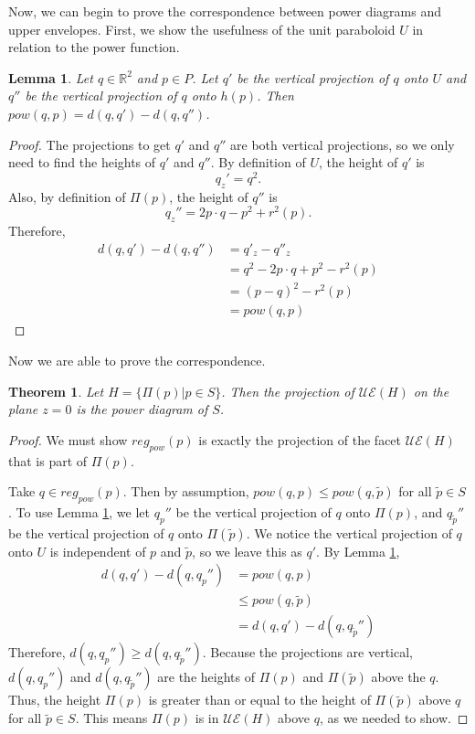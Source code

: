 \documentclass[a4paper, 11pt]{article}
\newtheorem{theorem}{Theorem}[section]
\newtheorem{lemma}{Lemma}[section]
\newcommand{\R}{\mathbb{R}}
\begin{document}
Now, we can begin to prove the correspondence between power diagrams and upper envelopes. First, we show the usefulness of the unit paraboloid $U$ in
relation to the power function.

\begin{lemma}
  \label{lem:proj}
  Let $q \in \R^2$ and $p \in P$. Let $q'$ be the vertical projection of $q$ onto $U$ and $q''$ be the vertical projection of $q$ onto $h(p)$. Then
  $pow(q, p) = d(q, q') - d(q, q'')$.
\end{lemma}
\begin{proof}
  The projections to get $q'$ and $q''$ are both vertical projections, so we only need to find the heights of $q'$ and $q''$. By
  definition of $U$, the height of $q'$ is
  \[ q_z' = q^2.\]
  Also, by definition of $\Pi(p)$, the height of $q''$ is
  \[ q_z'' = 2p \cdot q - p^2 + r^2(p) . \]
  Therefore,
  \begin{align*}
    d(q,q') - d(q,q'') &= q'_z - q''_z \\
    &= q^2 - 2 p \cdot q + p^2 - r^2(p) \\
    &= (p-q)^2 - r^2(p) \\
    &= pow(q,p)
  \end{align*}
\end{proof}

Now we are able to prove the correspondence.

\begin{theorem}
  Let $H = \{ \Pi(p) | p \in S \}$. Then the projection of $\mathcal{UE}(H)$ on the plane $z=0$ is the power diagram of $S$.
  \label{thm:ue_to_pow}
\end{theorem}
\begin{proof}
  We must show $reg_{pow}(p)$ is exactly the projection of the facet $\mathcal{UE}(H)$ that is part of $\Pi(p)$.

  Take $q \in reg_{pow}(p)$. Then by assumption, $pow(q,p) \leq pow(q,\tilde{p})$ for all $\tilde{p} \in S$. To use Lemma \ref{lem:proj}, we let $q_p''$ be the
  vertical projection of $q$ onto $\Pi(p)$, and $q_{\tilde{p}}''$ be the vertical projection of $q$ onto $\Pi(\tilde{p})$. We notice the vertical projection
  of $q$ onto $U$ is independent of $p$ and $\tilde{p}$, so we leave this as $q'$. By Lemma \ref{lem:proj},
  \begin{align*}
    d(q,q') - d(q,q_p'') &= pow(q,p) \\
    &\leq pow(q,\tilde{p}) \\
    &= d(q,q') - d(q,q_{\tilde{p}}'')
  \end{align*}
  Therefore, $d(q,q_p'') \geq d(q, q_{\tilde{p}}'')$. Because the projections are vertical, $d(q,q_p'')$ and $d(q, q_{\tilde{p}}'')$ are the heights of
  $\Pi(p)$ and $\Pi(\tilde{p})$ above the $q$. Thus, the height $\Pi(p)$ is greater than or equal to the height of $\Pi(\tilde{p})$ above $q$ for all
  $\tilde{p} \in S$. This means $\Pi(p)$ is in $\mathcal{UE}(H)$ above $q$, as we needed to show.
\end{proof}
\end{document}
